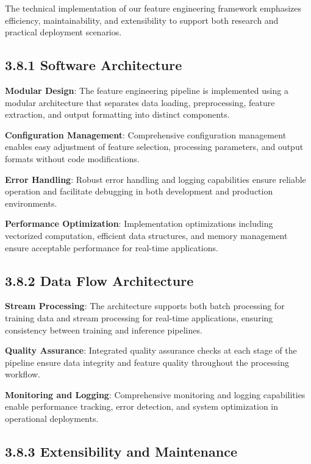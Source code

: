 \documentclass[
  12pt,
  a4paper,
]{report}
\begin{document}
The technical implementation of our feature engineering framework
emphasizes efficiency, maintainability, and extensibility to support
both research and practical deployment scenarios.

\subsection{3.8.1 Software Architecture}\label{software-architecture}

\textbf{Modular Design}: The feature engineering pipeline is implemented
using a modular architecture that separates data loading, preprocessing,
feature extraction, and output formatting into distinct components.

\textbf{Configuration Management}: Comprehensive configuration
management enables easy adjustment of feature selection, processing
parameters, and output formats without code modifications.

\textbf{Error Handling}: Robust error handling and logging capabilities
ensure reliable operation and facilitate debugging in both development
and production environments.

\textbf{Performance Optimization}: Implementation optimizations
including vectorized computation, efficient data structures, and memory
management ensure acceptable performance for real-time applications.

\subsection{3.8.2 Data Flow Architecture}\label{data-flow-architecture}

\textbf{Stream Processing}: The architecture supports both batch
processing for training data and stream processing for real-time
applications, ensuring consistency between training and inference
pipelines.

\textbf{Quality Assurance}: Integrated quality assurance checks at each
stage of the pipeline ensure data integrity and feature quality
throughout the processing workflow.

\textbf{Monitoring and Logging}: Comprehensive monitoring and logging
capabilities enable performance tracking, error detection, and system
optimization in operational deployments.

\subsection{3.8.3 Extensibility and
Maintenance}\label{extensibility-and-maintenance}
\end{document}
